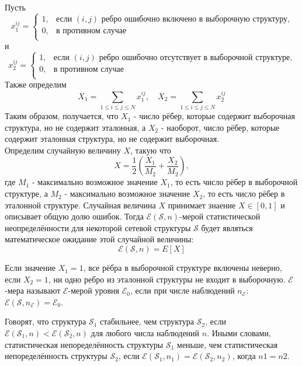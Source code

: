 Пусть 
\begin{equation*}
  x_{1}^{i j} =
    \begin{cases}
      1, & \text{если $(i,j)$ ребро ошибочно включено в выборочную структуру,}\\
      0, & \text{в противном случае}\\
    \end{cases}       
\end{equation*}
и
\begin{equation*}
  x_{2}^{i j} =
    \begin{cases}
      1, & \text{если $(i,j)$ ребро ошибочно отсутствует в выборочной структуре,}\\
      0, & \text{в противном случае}\\
    \end{cases}       
\end{equation*}
Также определим
\[
X_1=\sum_{1\leq i \leq j \leq N}{x_{1}^{i j}}, \quad  X_2=\sum_{1\leq i \leq j \leq N}{x_{2}^{i j}}
\]
Таким образом, получается, что $X_1$ - число рёбер, которые содержит выборочная структура, но не содержит эталонная, а $X_2$ - наоборот, число рёбер, которые содержит эталонная структура, но не содержит выборочная.\\
Определим случайную величину $X$, такую что
\begin{equation}
X = \frac{1}{2}\left( \frac{X_1}{M_2}+\frac{X_2}{M_2} \right),
\end{equation}
где $M_1$ - максимально возможное значение $X_1$, то есть число рёбер в выборочной структуре, а $M_2$ - максимально возможное значение $X_2$, то есть число рёбер в эталонной структуре. Случайная величина $X$ принимает знаение $X \in [0,1]$ и описывает общую долю ошибок. 
Тогда $\mathcal{E}(\mathcal{S}, n)$-мерой статистической неопределённости для некоторой сетевой структуры $\mathcal{S}$ будет являться математическое ожидание этой случайной величины: 
\begin{equation}
\mathcal{E}(\mathcal{S},n) = E[X]
\end{equation}

Если значение $X_1=1$, все рёбра в выборочной структуре включены неверно, если $X_2=1$, ни одно ребро из эталонной структуры не входит в выборочную. $\mathcal{E}$-мера называют $\mathcal{E}$-мерой уровня $\mathcal{E}_0$, если при числе наблюдений $n_\mathcal{E}$: $\mathcal{E}(\mathcal{S},n_\mathcal{E}) = \mathcal{E}_0$.

Говорят, что структура $\mathcal{S_1}$ стабильнее, чем структура $\mathcal{S_2}$, если $\mathcal{E}(\mathcal{S}_1,n) < \mathcal{E}(\mathcal{S}_2,n) $ для любого числа наблюдений $n$. Иными словами, статистическая непоределённость структуры $\mathcal{S_1}$  меньше, чем статистическая непоределённость структуры $\mathcal{S_2}$, если $\mathcal{E}(\mathcal{S}_1,n_1) = \mathcal{E}(\mathcal{S}_2,n_2) $, когда $n1=n2$.


